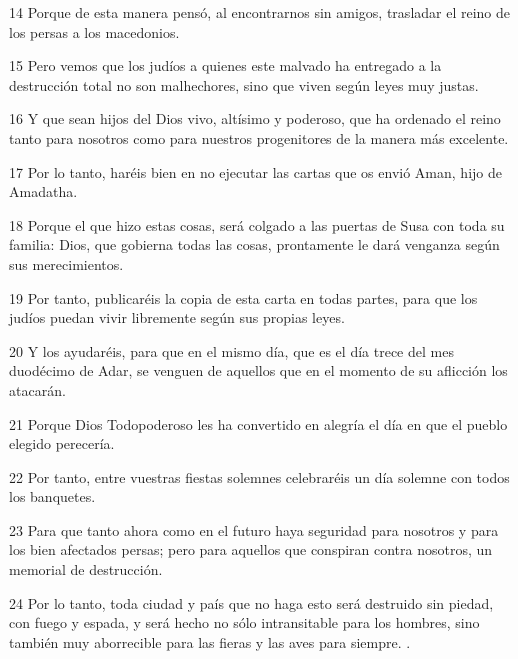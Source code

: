 \par 14 Porque de esta manera pensó, al encontrarnos sin amigos, trasladar el reino de los persas a los macedonios.
\par 15 Pero vemos que los judíos a quienes este malvado ha entregado a la destrucción total no son malhechores, sino que viven según leyes muy justas.
\par 16 Y que sean hijos del Dios vivo, altísimo y poderoso, que ha ordenado el reino tanto para nosotros como para nuestros progenitores de la manera más excelente.
\par 17 Por lo tanto, haréis bien en no ejecutar las cartas que os envió Aman, hijo de Amadatha.
\par 18 Porque el que hizo estas cosas, será colgado a las puertas de Susa con toda su familia: Dios, que gobierna todas las cosas, prontamente le dará venganza según sus merecimientos.
\par 19 Por tanto, publicaréis la copia de esta carta en todas partes, para que los judíos puedan vivir libremente según sus propias leyes.
\par 20 Y los ayudaréis, para que en el mismo día, que es el día trece del mes duodécimo de Adar, se venguen de aquellos que en el momento de su aflicción los atacarán.
\par 21 Porque Dios Todopoderoso les ha convertido en alegría el día en que el pueblo elegido perecería.
\par 22 Por tanto, entre vuestras fiestas solemnes celebraréis un día solemne con todos los banquetes.
\par 23 Para que tanto ahora como en el futuro haya seguridad para nosotros y para los bien afectados persas; pero para aquellos que conspiran contra nosotros, un memorial de destrucción.
\par 24 Por lo tanto, toda ciudad y país que no haga esto será destruido sin piedad, con fuego y espada, y será hecho no sólo intransitable para los hombres, sino también muy aborrecible para las fieras y las aves para siempre. .

